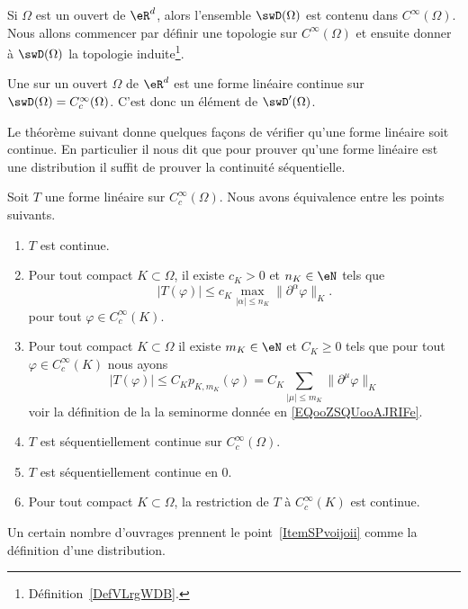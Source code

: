 Si \( \Omega\) est un ouvert de \( \eR^d\), alors l'ensemble \( \swD(\Omega)\) est contenu dans \(  C^{\infty}(\Omega)\). Nous allons commencer par définir une topologie sur \(  C^{\infty}(\Omega)\) et ensuite donner à \( \swD(\Omega)\) la topologie induite\footnote{Définition~\ref{DefVLrgWDB}.}.

\begin{definition}[Distribution]    \label{DefPZDtWVP}
	Une  sur un ouvert \( \Omega\) de \( \eR^d\) est une forme linéaire continue sur \(\swD(\Omega)= C^{\infty}_c(\Omega)\). C'est donc un élément de \( \swD'(\Omega)\).
\end{definition}

Le théorème suivant donne quelques façons de vérifier qu'une forme linéaire soit continue. En particulier il nous dit que pour prouver qu'une forme linéaire est une distribution il suffit de prouver la continuité séquentielle.
\begin{theorem} \label{ThoVDDBnVn}
	Soit \( T\) une forme linéaire sur \( C^{\infty}_c(\Omega)\). Nous avons équivalence entre les points suivants.
	\begin{enumerate}
		\item		\label{ITEMooQXXDooDleaQD}
		      \( T\) est continue.
		\item		\label{ITMooMDODooPULDzj}
		      Pour tout compact \( K\subset \Omega\), il existe \( c_K>0\) et \( n_K\in \eN\) tels que
		      \begin{equation}
			      | T(\varphi) |\leq c_K\max_{| \alpha |\leq n_K}\| \partial^{\alpha}\varphi\|_{K}.
		      \end{equation}
		      pour tout \( \varphi\in C^{\infty}_c(K)\).
		\item   \label{ItemSPvoijoii}
		      Pour tout compact \( K\subset \Omega\) il existe \( m_K\in \eN\) et \( C_K\geq 0\) tels que pour tout \( \varphi\in C^{\infty}_c(K)\) nous ayons
		      \begin{equation}
			      \big| T(\varphi) \big|\leq C_K p_{K,m_K}(\varphi)=C_K\sum_{| \mu |\leq m_K}\| \partial^{\mu}\varphi \|_K
		      \end{equation}
		      voir la définition de la la seminorme donnée en \eqref{EQooZSQUooAJRIFe}.
		\item       \label{ITEMooBXFSooYtAXjy}
		      \( T\) est séquentiellement continue sur \( C^{\infty}_c(\Omega)\).
		\item		\label{ITEMooXZJPooYyQQod}
		      \( T\) est séquentiellement continue en \( 0\).
		\item		\label{ITEMooPTDMooHBrnXk}
		      Pour tout compact \( K\subset \Omega\), la restriction de \( T\) à \( C^{\infty}_c(K)\) est continue.
	\end{enumerate}
	Un certain nombre d'ouvrages prennent le point~\ref{ItemSPvoijoii} comme la définition d'une distribution.
\end{theorem}

